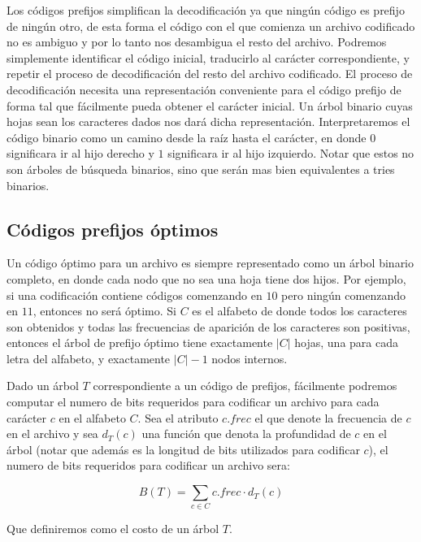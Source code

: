 Los c\'odigos prefijos simplifican la decodificaci\'on ya que ning\'un c\'odigo es prefijo de ning\'un otro, de esta forma el c\'odigo con el que comienza un archivo codificado no es ambiguo y por lo tanto nos desambigua el resto del archivo. Podremos simplemente identificar el c\'odigo inicial, traducirlo al car\'acter correspondiente, y repetir el proceso de decodificaci\'on del resto del archivo codificado. El proceso de decodificaci\'on necesita una representaci\'on conveniente para el c\'odigo prefijo de forma tal que f\'acilmente pueda obtener el car\'acter inicial. Un \'arbol binario cuyas hojas sean los caracteres dados nos dar\'a dicha representaci\'on. Interpretaremos el c\'odigo binario como un camino desde la ra\'iz hasta el car\'acter, en donde $0$ significara ir al hijo derecho y $1$ significara ir al hijo izquierdo. Notar que estos no son \'arboles de b\'usqueda binarios, sino que ser\'an mas bien equivalentes a tries binarios.

\subsection{C\'odigos prefijos \'optimos}

Un c\'odigo \'optimo para un archivo es siempre representado como un \'arbol binario completo, en donde cada nodo que no sea una hoja tiene dos hijos. Por ejemplo, si una codificaci\'on contiene c\'odigos comenzando en $10$ pero ning\'un comenzando en $11$, entonces no ser\'a \'optimo. Si $C$ es el alfabeto de donde todos los caracteres son obtenidos y todas las frecuencias de aparici\'on de los caracteres son positivas, entonces el \'arbol de prefijo \'optimo tiene exactamente $|C|$ hojas, una para cada letra del alfabeto, y exactamente $|C|-1$ nodos internos.

Dado un \'arbol $T$ correspondiente a un c\'odigo de prefijos, f\'acilmente podremos computar el numero de bits requeridos para codificar un archivo para cada car\'acter $c$ en el alfabeto $C$. Sea el atributo $c.frec$ el que denote la frecuencia de $c$ en el archivo y sea $d_T(c)$ una funci\'on que denota la profundidad de $c$ en el \'arbol (notar que adem\'as es la longitud de bits utilizados para codificar $c$), el numero de bits requeridos para codificar un archivo sera:

\begin{equation*}
 B(T) = \sum_{c \in C} c.frec \cdot d_T(c)
\end{equation*}

Que definiremos como el costo de un \'arbol $T$.

